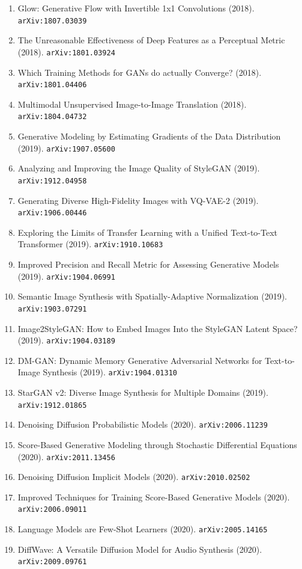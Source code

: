 \documentclass[11pt]{article}
\begin{document}
\begin{enumerate}
  \item Glow: Generative Flow with Invertible 1x1 Convolutions (2018). \texttt{arXiv:1807.03039}
  \item The Unreasonable Effectiveness of Deep Features as a Perceptual Metric (2018). \texttt{arXiv:1801.03924}
  \item Which Training Methods for GANs do actually Converge? (2018). \texttt{arXiv:1801.04406}
  \item Multimodal Unsupervised Image-to-Image Translation (2018). \texttt{arXiv:1804.04732}
  \item Generative Modeling by Estimating Gradients of the Data Distribution (2019). \texttt{arXiv:1907.05600}
  \item Analyzing and Improving the Image Quality of StyleGAN (2019). \texttt{arXiv:1912.04958}
  \item Generating Diverse High-Fidelity Images with VQ-VAE-2 (2019). \texttt{arXiv:1906.00446}
  \item Exploring the Limits of Transfer Learning with a Unified Text-to-Text Transformer (2019). \texttt{arXiv:1910.10683}
  \item Improved Precision and Recall Metric for Assessing Generative Models (2019). \texttt{arXiv:1904.06991}
  \item Semantic Image Synthesis with Spatially-Adaptive Normalization (2019). \texttt{arXiv:1903.07291}
  \item Image2StyleGAN: How to Embed Images Into the StyleGAN Latent Space? (2019). \texttt{arXiv:1904.03189}
  \item DM-GAN: Dynamic Memory Generative Adversarial Networks for Text-to-Image Synthesis (2019). \texttt{arXiv:1904.01310}
  \item StarGAN v2: Diverse Image Synthesis for Multiple Domains (2019). \texttt{arXiv:1912.01865}
  \item Denoising Diffusion Probabilistic Models (2020). \texttt{arXiv:2006.11239}
  \item Score-Based Generative Modeling through Stochastic Differential Equations (2020). \texttt{arXiv:2011.13456}
  \item Denoising Diffusion Implicit Models (2020). \texttt{arXiv:2010.02502}
  \item Improved Techniques for Training Score-Based Generative Models (2020). \texttt{arXiv:2006.09011}
  \item Language Models are Few-Shot Learners (2020). \texttt{arXiv:2005.14165}
  \item DiffWave: A Versatile Diffusion Model for Audio Synthesis (2020). \texttt{arXiv:2009.09761}

\end{enumerate}
\end{document}
